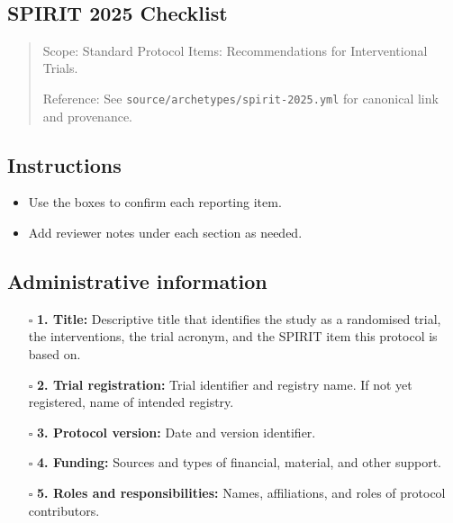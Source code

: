 \documentclass[11pt]{article}
\def\tightlist{}
\begin{document}
\begin{center}
{\LARGE }\\[4pt]
\normalsize 
\end{center}
\vspace{1em}

\begin{Form}

\section{SPIRIT 2025 Checklist}\label{spirit-2025-checklist}

\begin{quote}
Scope: Standard Protocol Items: Recommendations for Interventional
Trials.

Reference: See \texttt{source/archetypes/spirit-2025.yml} for canonical
link and provenance.
\end{quote}

\subsection{Instructions}\label{instructions}

\begin{itemize}
\tightlist
\item
  Use the boxes to confirm each reporting item.
\item
  Add reviewer notes under each section as needed.
\end{itemize}

\subsection{Administrative
information}\label{administrative-information}

\begin{itemize}
\tightlist
\item[$\square$]
  \textbf{1. Title:} Descriptive title that identifies the study as a
  randomised trial, the interventions, the trial acronym, and the SPIRIT
  item this protocol is based on.
\item[$\square$]
  \textbf{2. Trial registration:} Trial identifier and registry name. If
  not yet registered, name of intended registry.
\item[$\square$]
  \textbf{3. Protocol version:} Date and version identifier.
\item[$\square$]
  \textbf{4. Funding:} Sources and types of financial, material, and
  other support.
\item[$\square$]
  \textbf{5. Roles and responsibilities:} Names, affiliations, and roles
  of protocol contributors.
\end{itemize}


\end{Form}
\end{document}
